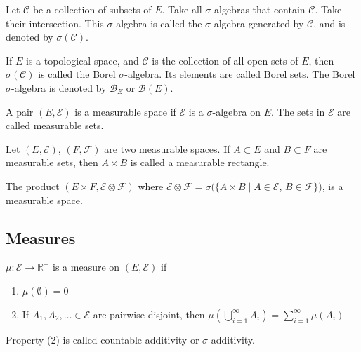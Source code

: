 \documentclass[12pt, titlepage]{article}
\begin{document}
\begin{dfn}{}
	Let $\mathcal{C}$ be a collection of subsets of $E$. Take all $\sigma$-algebras that contain $\mathcal{C}$. Take their intersection. This $\sigma$-algebra is called the $\sigma$-algebra generated by $\mathcal{C}$, and is denoted by $\sigma(\mathcal{C})$.
\end{dfn}

\begin{dfn}{}
	If $E$ is a topological space, and $\mathcal{C}$ is the collection of all open sets of $E$, then $\sigma (\mathcal{C})$ is called the Borel $\sigma$-algebra. Its elements are called Borel sets. The Borel $\sigma$-algebra is denoted by $\mathcal{B}_E$ or $\mathcal{B}(E)$.
\end{dfn}

\begin{dfn}{}
	A pair $(E, \mathcal{E})$ is a measurable space if $\mathcal{E}$ is a $\sigma$-algebra on $E$. The sets in $\mathcal{E}$ are called measurable sets.
\end{dfn}

\begin{dfn}{}
	Let $(E, \mathcal{E})$, $(F, \mathcal{F})$ are two measurable spaces. If $A \subset E$ and $B \subset F$ are measurable sets, then $A \times B$ is called a measurable rectangle.\\
\end{dfn}

\begin{dfn}{}
	The product $(E \times F, \mathcal{E} \otimes \mathcal{F})$ where $\mathcal{E} \otimes \mathcal{F} = \sigma(\{A \times B \mid A \in \mathcal{E}$, $B \in \mathcal{F}\})$, is a measurable space.\\
\end{dfn}

\subsection{Measures}

\begin{dfn}[Measure]{}
	$\mu: \mathcal{E} \to \mathbb{R^+}$ is a measure on $(E, \mathcal{E})$ if
	\begin{enumerate}
		\item $\mu(\emptyset) = 0$
		\item If $A_1, A_2, \dots \in \mathcal{E}$ are pairwise disjoint, then $\mu(\bigcup^\infty_{i = 1} A_i) = \sum^\infty_{i = 1}\mu(A_i)$
	\end{enumerate}
\end{dfn}
Property (2) is called countable additivity or $\sigma$-additivity.\\
\end{document}
